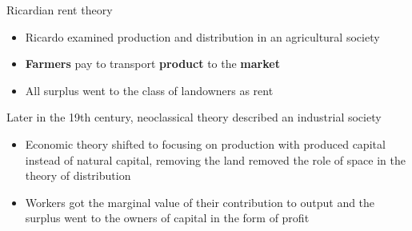 \documentclass[]{beamer} %
\begin{document}
\begin{frame}{Ricardian rent theory}
\begin{itemize}\Large
    \item Ricardo examined production and distribution in an agricultural society
    \item \textbf{Farmers} pay to transport \textbf{product} to the \textbf{market}
    \item All surplus went to the class of landowners as rent
\end{itemize}
\begin{centering}  \vspace{0cm}\hspace{1cm} 
\end{centering}
\end{frame}

\begin{frame}{Later in the 19th century, neoclassical theory described  an industrial society}
\begin{itemize}
\item Economic theory shifted to focusing on production with produced capital instead of natural capital, removing the land removed the role of space in the theory of distribution


\item Workers got the marginal value of their contribution to output and the surplus went to the owners of capital in the form of profit 

\end{itemize}
\end{frame}
\end{document}
